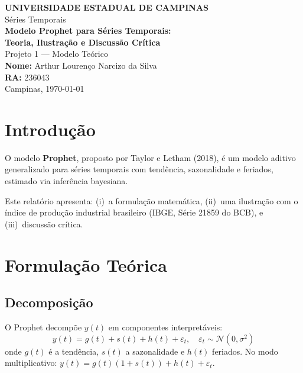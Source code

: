 \documentclass[12pt, a4paper]{article}
\begin{document}
\begin{titlepage}
\centering
\vspace*{2cm}
{\Large \textbf{UNIVERSIDADE ESTADUAL DE CAMPINAS}}\\[0.2cm]
{\large Séries Temporais}\\[3cm]
{\LARGE \textbf{Modelo Prophet para Séries Temporais:\\
Teoria, Ilustração e Discussão Crítica}}\\[2cm]
{\Large Projeto 1 — Modelo Teórico}\\[3cm]
{\large
\textbf{Nome:} Arthur Lourenço Narcizo da Silva\\[0.2cm]
\textbf{RA:} 236043\\[0.2cm]
}
{\large Campinas, \today}
\end{titlepage}

\tableofcontents
\newpage

\section{Introdução}

O modelo \textbf{Prophet}, proposto por Taylor e Letham (2018),
é um modelo aditivo generalizado para séries temporais com
tendência, sazonalidade e feriados, estimado via inferência
bayesiana.

Este relatório apresenta: (i)~a formulação matemática,
(ii)~uma ilustração com o índice de produção industrial
brasileiro (IBGE, Série 21859 do BCB), e (iii)~discussão crítica.

\section{Formulação Teórica}

\subsection{Decomposição}

O Prophet decompõe $y(t)$ em componentes interpretáveis:
\begin{equation}
    y(t) = g(t) + s(t) + h(t) + \varepsilon_t,
    \quad \varepsilon_t \sim \mathcal{N}(0, \sigma^2)
    \label{eq:prophet}
\end{equation}
onde $g(t)$ é a tendência, $s(t)$ a sazonalidade e $h(t)$
feriados. No modo multiplicativo:
$y(t) = g(t)(1 + s(t)) + h(t) + \varepsilon_t$.
\end{document}
